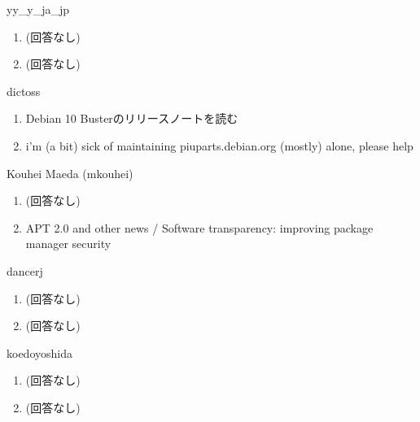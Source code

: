 \begin{prework}{ yy\_y\_ja\_jp }
  \begin{enumerate}
  \item (回答なし)
  \item (回答なし)
  \end{enumerate}
\end{prework}

\begin{prework}{ dictoss }
  \begin{enumerate}
  \item Debian 10 Busterのリリースノートを読む
  \item i'm (a bit) sick of maintaining piuparts.debian.org (mostly) alone, please help
  \end{enumerate}
\end{prework}

\begin{prework}{ Kouhei Maeda (mkouhei) }
  \begin{enumerate}
  \item (回答なし)
  \item APT 2.0 and other news / Software transparency: improving package manager security
  \end{enumerate}
\end{prework}

\begin{prework}{ dancerj }
  \begin{enumerate}
  \item (回答なし)
  \item (回答なし)
  \end{enumerate}
\end{prework}

\begin{prework}{ koedoyoshida }
  \begin{enumerate}
  \item (回答なし)
  \item (回答なし)
  \end{enumerate}
\end{prework}
